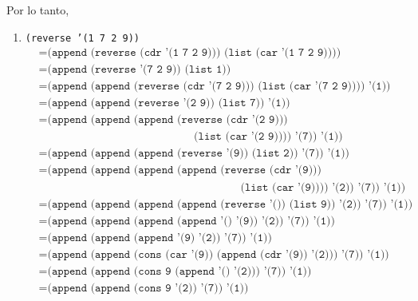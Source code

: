 \documentclass[letterpaper,11pt]{article}
\begin{document}
\begin{enumerate}
    Por lo tanto, 
    \begin{enumerate}
        \item \texttt{(reverse '(1 7 2 9))}
        \begin{align*}
            &= \texttt{(append (reverse (cdr '(1 7 2 9))) 
                               (list (car '(1 7 2 9))))} \\
            &= \texttt{(append (reverse '(7 2 9)) (list 1))} \\
            &= \texttt{(append (append (reverse (cdr '(7 2 9))) 
                                       (list (car '(7 2 9)))) '(1))} \\
            &= \texttt{(append (append (reverse '(2 9)) (list 7)) '(1))} \\
            &= \texttt{(append (append (append (reverse (cdr '(2 9)))} \\
            & \; \; \; \; \; \; \; \; \; \; \; \; \; \; \; \; \; \; \; \; \; \;  
              \; \; \; \; \; \; \; \; \; \; \; \; \; \; \; \; \; \; \; \; \; \;
              \; \; \; \; \; \;                
                                               \texttt{(list (car '(2 9)))) '(7)) '(1))} \\
            &= \texttt{(append (append (append (reverse '(9)) (list 2)) '(7)) '(1))} \\ 
            &= \texttt{(append (append (append (append (reverse (cdr '(9)))} \\ 
            & \; \; \; \; \; \; \; \; \; \; \; \; \; \; \; \; \; \; \; \; \; \;
              \; \; \; \; \; \; \; \; \; \; \; \; \; \; \; \; \; \; \; \; \; \;
              \; \; \; \; \; \; \; \; \; \; \; \; \; \; \; \; \; \; \; \; \;
                                                       \texttt{(list (car '(9)))) '(2)) '(7)) '(1))} \\
            &= \texttt{(append (append (append (append (reverse '()) (list 9)) '(2)) '(7)) '(1))} \\
            &= \texttt{(append (append (append (append '() '(9)) '(2)) '(7)) '(1))} \\
            &= \texttt{(append (append (append '(9) '(2)) '(7)) '(1))} \\
            &= \texttt{(append (append (cons (car '(9)) (append (cdr '(9)) '(2))) '(7)) '(1))} \\
            &= \texttt{(append (append (cons 9 (append '() '(2))) '(7)) '(1))} \\
            &= \texttt{(append (append (cons 9 '(2)) '(7)) '(1))} \\

\end{align*}
\end{enumerate}
\end{enumerate}
\end{document}
